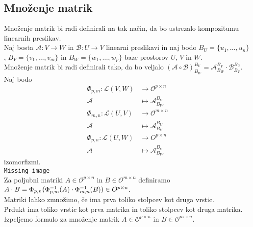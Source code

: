 \documentclass[a4paper,12pt]{article}
\newcommand{\OO}{\mathcal{O}}
\begin{document}
\newpage 

\subsection{Množenje matrik}

Množenje matrik bi radi definirali na tak način, da bo ustrezalo kompozitumu linearnih preslikav. \\

Naj bosta $\mathcal{A}:V\to W$ in $\mathcal{B}:U\to V$ linearni preslikavi  in naj bodo $B_U=\{u_1,\ldots,u_n\}$, $B_V=\{v_1,\ldots,v_m\}$ in $B_W=\{w_1,\ldots,w_p\}$ baze prostorov $U$, $V$ in $W$. \\

Množenje matrik bi radi definirali tako, da bo veljalo $(\mathcal{A}\circ \mathcal{B})_{B_W}^{B_U}=\mathcal{A}_{B_W}^{B_V} \cdot \mathcal{B}_{B_V}^{B_U}$. \\

Naj bodo 
\begin{align*}
	\Phi_{p,m}: \mathcal{L}(V,W) & \to \OO^{p\times n}\\
	 \mathcal{A} & \mapsto \mathcal{A}_{B_W}^{B_V} \\
	\Phi_{m,n}: \mathcal{L}(U,V) & \to \mathcal{O}^{m\times n} \\
	 \mathcal{A} & \mapsto \mathcal{A}_{B_V}^{B_U} \\
	\Phi_{p,n}: \mathcal{L}(U,W) & \to O^{p\times n} \\
	 \mathcal{A} & \mapsto \mathcal{A}_{B_W}^{B_V}
\end{align*} 
izomorfizmi. \\

\texttt{Missing image} \\

Za poljubni matriki $A\in \OO^{p\times n}$ in $B\in \mathcal{O}^{m\times n}$ definiramo $A\cdot B=\Phi_{p,n} (\Phi_{p,m}^{-1}(A)\cdot \Phi_{m,n}^{-1}(B))\linebreak \in O^{p\times n}$. \\

Matriki lahko zmnožimo, če ima prva toliko stolpcev kot druga vrstic. \\

Prdukt ima toliko vrstic kot prva matrika in toliko stolpcev kot druga matrika. \\

Izpeljemo formulo za množenje matrik $A\in \OO^{p\times n}$ in $B\in \mathcal{O}^{m\times n}$. \\
\end{document}
